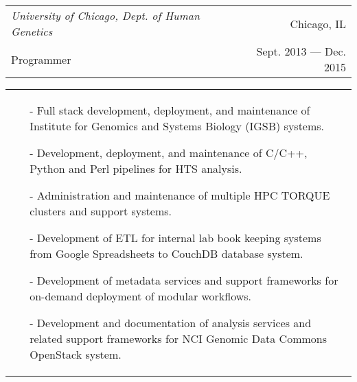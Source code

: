 \begin{tabularx}{\textwidth}{L R}
    \textit{University of Chicago, Dept. of Human Genetics} & Chicago, IL \\
    \small{Programmer} & \small{Sept. 2013 --- Dec. 2015} \\
\end{tabularx}
\begin{tabularx}{\textwidth}{X}
    \begin{small}
    \begin{itemize}
        \itemsep{}
        \item[-] Full stack development, deployment, and maintenance of Institute for Genomics and Systems Biology (IGSB) systems.
        \item[-] Development, deployment, and maintenance of C/C++, Python and Perl pipelines for HTS analysis.
        \item[-] Administration and maintenance of multiple HPC TORQUE clusters and support systems.
        \item[-] Development of ETL for internal lab book keeping systems from Google Spreadsheets to CouchDB database system.
        \item[-] Development of metadata services and support frameworks for on-demand deployment of modular workflows.
        \item[-] Development and documentation of analysis services and related support frameworks for NCI Genomic Data Commons OpenStack system.
    \end{itemize}
    \end{small}
\end{tabularx}
